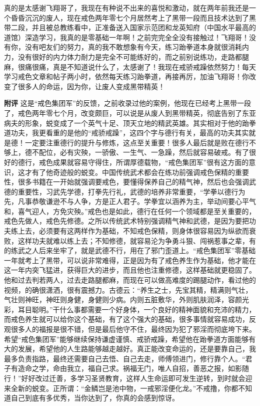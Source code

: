 \begin{case}
    真的是太感谢飞翔哥了，我现在有种说不出来的喜悦和激动，就在两年前我还是一个昏昏沉沉的废人，现在戒色两年零七个月居然考上了黑带一段而且技术达到了黑带二段，并且被总教练看中，正准备送入国家示范团和龙英知府（中国水平最高的道馆）深造学习，我真的是零基础一年啊！之前完完全全没有接触过！飞翔哥！没有你，没有吧友们的努力，真的我不敢想象有今天，练习跆拳道本身就很消耗内力，没有很好的内力体力耐力是完全不可能练好的，而之前别说练功，走路都腿麻，很痛很痛，真是不知道说什么了，太感谢了！我现在戒骄戒躁依然努力！每天学习戒色文章和帖子两小时，依然每天练习跆拳道，再接再厉，加油飞翔哥！你改变了很多人的命运，因为你，让废人变成黑带精英！

    \textbf{附评} 这是“戒色集团军”的反馈，之前收录过他的案例，他现在已经考上黑带一段了，戒色两年零七个月，改变颇巨，可以说是从废人到黑带精英，彻底告别了东亚病夫的形象，蜕变成了一个英气十足、顶天立地的精武英雄。其实相对于他的跆拳道功夫，我更看重的是他的“戒骄戒躁”，这四个字与德行有关，最高的功夫其实就是德！一定要注重德行的提升与修炼，这点至关重要！很多人最后就是败在德行不够上，德不配位，必有灾殃，一骄傲、一生气、一急躁，然后就容易破戒。有了很好的德行，戒色成果就容易守得住，所谓厚德载物，“戒色集团军”很有这方面的意识，这才有了他奇迹般的蜕变。中国传统武术都会在练功前强调戒色保精的重要性，很多书籍在一开始就强调要戒色，要懂得保养自己的精气神，然后也会强调武德的重要性，习武先学德，打拳先行礼，武德的培养非常重要，“学拳以德行为先，凡事恭敬谦逊不与人争，方是正人君子。学拳宜以涵养为主，举动间要心平气和，喜气迎人，方免灾殃。”戒色也是如此，德行在任何一个领域都是至关重要的，戒色先做人，戒色先修德。之所以传统武术特别强调精气神和武德，是因为要把功夫练上去，必须要有这两样作为基础，不知戒色保精，则身体很容易因为纵欲而衰败，这样功夫就难以练上去；不知修德，就容易沦为争勇斗狠、闯祸惹事之辈，有的练武之人后来坐牢了，就是武德不行，用在了邪门歪道上。“戒色集团军”零基础一年就考上了黑带，可以说非常难得，正是因为有了戒色养生作为基础，他才能在这一年内突飞猛进，获得巨大的进步，而且他也注重修德，这样基础就更稳固了。他和过去判若两人，过去走路腿都麻，而现在可以做高难度的踢腿动作，看过他的视频，的确很潇洒，很有震撼力。古德云：“养生之士，先宝其精，精满则气壮，气壮则神旺，神旺则身健，身健则少病。内则五脏敷华，外则肌肤润泽，容颜光彩，耳目聪明。”干什么事都需要一个好身体，一个良好的精神面貌和充沛的精力，而戒色养生就可以给你这个基础，有了这个强大的基础，很多事情就容易成功，反观很多人的福报是很不错，但是最后他守不住，最终因为犯了邪淫而彻底垮下来。希望“戒色集团军”能够继续保持谦虚谨慎、戒骄戒躁，希望他在跆拳道方面能够有大的发展，希望他的人生路能够越走越好。真正能改变命运的，还是要靠自己，我最多负责指路，最终还需要自己去悟、自己去走，师傅领进门，修行靠个人。“君子有造命之学，命由我立，福自己求。祸福无门，唯人自招，善恶之报，如影随行！”好好改过迁善，多学习圣贤教育，这样人生命运即可发生逆转，到时就会迎来全新的蜕变。正所谓：“金鳞岂是池中物，一戒邪淫便化龙。”不戒撸，你都不知道自己到底有多优秀，当你达到了，你真的会感到惊讶。
\end{case}


